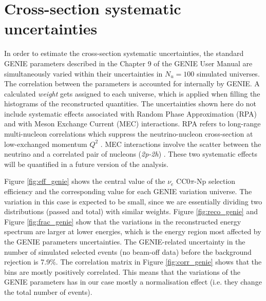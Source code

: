 \section{Cross-section systematic uncertainties}
In order to estimate the cross-section systematic uncertainties, the standard GENIE parameters described in the Chapter 9 of the GENIE User Manual \cite{Andreopoulos:2015wxa} are simultaneously varied within their uncertainties in $N_{u} = 100$ simulated universes. The correlation between the parameters is accounted for internally by GENIE. A calculated \emph{weight} gets assigned to each universe, which is applied when filling the histograms of the reconstructed quantities. The uncertainties shown here do not include systematic effects associated with Random Phase Approximation (RPA) and with Meson Exchange Current (MEC) interactions. RPA refers to long-range multi-nucleon correlations which suppress the neutrino-nucleon cross-section at low-exchanged momentum $Q^2$ \cite{Nieves:2011pp}. MEC interactions involve the scatter between the neutrino and a correlated pair of nucleons (\emph{2p-2h}) \cite{Bodek:2011ps}. These two systematic effects will be quantified in a future version of the analysis.

Figure \ref{fig:eff_genie} shows the central value of the $\nu_{e}$ CC0$\pi$-Np selection efficiency and the corresponding value for each GENIE variation universe. The variation in this case is expected to be small, since we are essentially dividing two distributions (passed and total) with similar weights. Figure \ref{fig:reco_genie} and Figure \ref{fig:frac_genie} show that the variations in the reconstructed energy spectrum are larger at lower energies, which is the energy region most affected by the GENIE parameters uncertainties. The GENIE-related uncertainty in the number of simulated selected events (no beam-off data) before the background rejection is 7.9\%.
The correlation matrix in Figure \ref{fig:corr_genie} shows that the bins are mostly positively correlated. This means that the variations of the GENIE parameters has in our case mostly a normalisation effect (i.e. they change the total number of events). 

